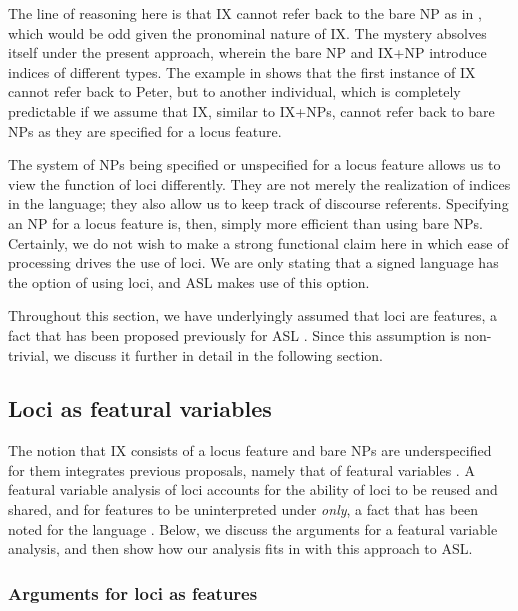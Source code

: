 \documentclass[output=paper,
modfonts
]{langscibook}
\begin{document}
\noindent The line of reasoning here is that IX cannot refer back to the bare NP as in , which would be odd given the pronominal nature of IX. The mystery absolves itself under the present approach, wherein the bare NP and IX+NP introduce indices of different types. The example in  shows that the first instance of IX cannot refer back to Peter, but to another individual, which is completely predictable if we assume that IX, similar to IX+NPs, cannot refer back to bare NPs as they are specified for a locus feature. 

The system of NPs being specified or unspecified for a locus feature allows us to view the function of loci differently. They are not merely the realization of indices in the language; they also allow us to keep track of discourse referents. Specifying an NP for a locus feature is, then, simply more efficient than using bare NPs. Certainly, we do not wish to make a strong functional claim here in which ease of processing drives the use of loci. We are only stating that a signed language has the option of using loci, and ASL makes use of this option.  

Throughout this section, we have underlyingly assumed that loci are features, a fact that has been proposed previously for ASL \citep{Kuhn2015, Schlenker2014}. Since this assumption is non-trivial, we discuss it further in detail in the following section. 

\subsection{Loci as featural variables}\label{sec:irani:4.3}

The notion that IX consists of a locus feature and bare NPs are underspecified for them integrates previous proposals, namely that of featural variables \citep{Schlenker2014}. A featural variable analysis of loci accounts for the ability of loci to be reused and shared, and for features to be uninterpreted under \textit{only}, a fact that has been noted for the language \citep{Kuhn2015}. Below, we discuss the arguments for a featural variable analysis, and then show how our analysis fits in with this approach to ASL. 

\subsubsection{Arguments for loci as features}
\end{document}
